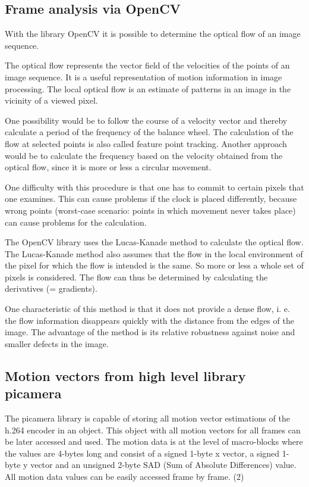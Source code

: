 \documentclass[12pt, a4paper]{report}
\begin{document}
\subsection{Frame analysis via OpenCV}
With the library OpenCV it is possible to determine the optical flow of an image sequence. 

The optical flow represents the vector field of the velocities of the points of an image sequence. It is a useful representation of motion information in image processing. The local optical flow is an estimate of patterns in an image in the vicinity of a viewed pixel. 

One possibility would be to follow the course of a velocity vector and thereby calculate a period of the frequency of the balance wheel. The calculation of the flow at selected points is also called feature point tracking. Another approach would be to calculate the frequency based on the velocity obtained from the optical flow, since it is more or less a circular movement. 

One difficulty with this procedure is that one has to commit to certain pixels that one examines. This can cause problems if the clock is placed differently, because wrong points (worst-case scenario: points in which movement never takes place) can cause problems for the calculation.  

The OpenCV library uses the Lucas-Kanade method to calculate the optical flow. The Lucas-Kanade method also assumes that the flow in the local environment of the pixel for which the flow is intended is the same. So more or less a whole set of pixels is considered. The flow can thus be determined by calculating the derivatives (= gradients). 

One characteristic of this method is that it does not provide a dense flow, i. e. the flow information disappears quickly with the distance from the edges of the image. The advantage of the method is its relative robustness against noise and smaller defects in the image.

\subsection{Motion vectors from high level library picamera}
The picamera library is capable of storing all motion vector estimations of the h.264 encoder in an object. This object with all motion vectors for all frames can be later accessed and used. The motion data is at the level of macro-blocks where the values are 4-bytes long and consist of a signed 1-byte x vector, a signed 1-byte y vector and an unsigned 2-byte SAD (Sum of Absolute Differences) value. All motion data values can be easily accessed frame by frame. (2) 
\end{document}

